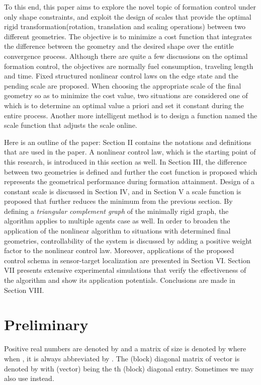 \documentclass[times]{rncauth}
\begin{document}
To this end, this paper aims to explore the novel topic of formation
control under only shape constraints, and exploit the design of
scales that provide the optimal rigid transformation(rotation, translation and scaling operations) between two different geometries. The objective is to minimize  a cost function that integrates the difference between the geometry and the desired shape over the entitle convergence process.
Although there are quite a few discussions on the optimal formation
control, the objectives are normally  fuel
consumption\cite{Kim09pathplanning}, traveling length and
time\cite{Tillerson02}. Fixed structured nonlinear control laws on the
edge state and the pending scale are proposed. When choosing the
appropriate scale of the final geometry so as to minimize the cost
value, two situations are considered one of which is to determine an
optimal value a priori and set it constant during the entire
process. Another more intelligent method is to design a function
named the scale function that adjusts the scale online.

Here is an outline of the paper: Section II contains the notations
and definitions that are used in the paper. A nonlinear control law,
which is the starting point of this research, is introduced in this
section as well. In Section III, the difference between two geometries is defined and
further the cost function is proposed which represents the geometrical performance during formation attainment.
Design of a constant  scale is discussed in Section IV, and in Section V a scale function is  proposed that  further reduces the minimum from the
previous section. By defining a \emph{triangular complement graph}
of the minimally rigid graph, the algorithm applies to multiple
 agents case as well. In order to broaden the application of
the nonlinear algorithm to situations with determined final
geometries, controllability of the system is discussed by adding a
positive weight factor to the nonlinear control law. Moreover,
applications of the proposed control schema in sensor-target
localization are presented in Section VI. Section VII presents
extensive experimental simulations that verify the effectiveness of
the algorithm and show its application potentials. Conclusions are
made in Section VIII.

\vspace{-6pt}

\section{Preliminary}
\vspace{-2pt}
 Positive real numbers are denoted by 
and a matrix of size  is denoted by  where when , it is always abbreviated by .
The (block) diagonal matrix of vector  is denoted by
 with (vector)  being the th (block)
diagonal entry. Sometimes we may also use
 instead.
\end{document}
